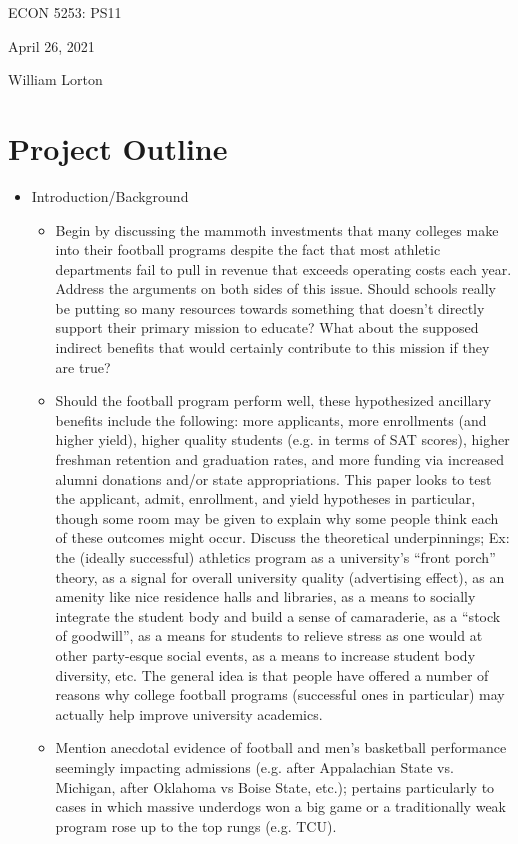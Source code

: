 \documentclass[12pt,english]{article}
\begin{document}
ECON 5253: PS11 

April 26, 2021

William Lorton

\section{Project Outline}
\begin{itemize}
\item Introduction/Background
    \begin{itemize}
    \item Begin by discussing the mammoth investments that many colleges make into their football programs despite the fact that most athletic departments fail to pull in revenue that exceeds operating costs each year. Address the arguments on both sides of this issue. Should schools really be putting so many resources towards something that doesn't directly support their primary mission to educate? What about the supposed indirect benefits that would certainly contribute to this mission if they are true?
    \item Should the football program perform well, these hypothesized ancillary benefits include the following: more applicants, more enrollments (and higher yield), higher quality students (e.g. in terms of SAT scores), higher freshman retention and graduation rates, and more funding via increased alumni donations and/or state appropriations. This paper looks to test the applicant, admit, enrollment, and yield hypotheses in particular, though some room may be given to explain why some people think each of these outcomes might occur. Discuss the theoretical underpinnings; Ex: the (ideally successful) athletics program as a university's ``front porch'' theory, as a signal for overall university quality (advertising effect), as an amenity like nice residence halls and libraries, as a means to socially integrate the student body and build a sense of camaraderie, as a ``stock of goodwill'', as a means for students to relieve stress as one would at other party-esque social events, as a means to increase student body diversity, etc. The general idea is that people have offered a number of reasons why college football programs (successful ones in particular) may actually help improve university academics.
    \item Mention anecdotal evidence of football and men's basketball performance seemingly impacting admissions (e.g. after Appalachian State vs. Michigan, after Oklahoma vs Boise State, etc.); pertains particularly to cases in which massive underdogs won a big game or a traditionally weak program rose up to the top rungs (e.g. TCU). 

\end{itemize}
\end{itemize}
\end{document}
